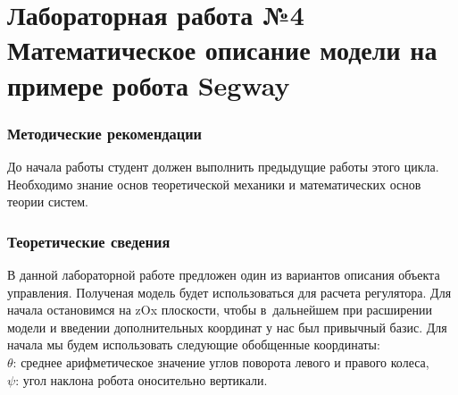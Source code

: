 \documentclass[12pt,a4paper,openany]{extarticle}
\begin{document}
\part*{Лабораторная работа №4\\
 Математическое описание модели на примере робота Segway}
\section{Методические рекомендации}
До начала работы студент должен выполнить предыдущие работы этого цикла. Необходимо знание основ теоретической механики и математических основ теории систем.
\section{Теоретические сведения}
В данной лабораторной работе предложен один из вариантов описания объекта управления. Полученая модель будет использоваться для расчета регулятора. Для начала остановимся на zOx плоскости, чтобы в~дальнейшем при расширении модели и введении дополнительных координат у нас был привычный базис.
Для начала мы будем использовать следующие обобщенные координаты:\\
$\theta$: среднее арифметическое значение углов поворота левого и правого колеса,\\
$\psi$: угол наклона робота оносительно вертикали.\\
\end{document}
